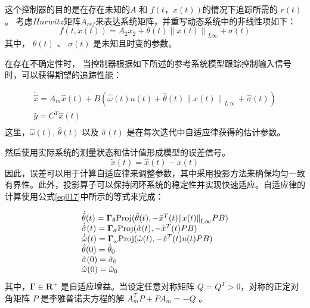这个控制器的目的是在存在未知的$A$ 和 $f(t，x(t))$的情况下追踪所需的 $r(t)$。 考虑$Hurwitz$矩阵$A_{ref}$来表达系统矩阵，并重写动态系统中的非线性项如下：
\begin{equation}
f(t,x(t)) = {A_2}{x_2} + \theta (t){\left\| {x(t)} \right\|_{L\infty }} + \sigma (t)
\end{equation}
其中， $\theta(t)$ 、 $\sigma(t)$ 是未知且时变的参数。

在存在不确定性时， 当控制器根据如下所述的参考系统模型跟踪控制输入信号时，可以获得期望的追踪性能：

\begin{equation}
\begin{array}{l}
 \dot{\hat{x}} = {A_m}\hat x(t) + {B}(\hat \omega (t)u(t) + \hat \theta (t){\left\| {x(t)} \right\|_{L \propto }} + \hat \sigma (t)) \\
 \hat y = {C^T}\hat x(t) \\
 \end{array}
 \end{equation}
这里，$\hat \omega (t)$, $\hat \theta (t)$ 以及 $\hat \sigma (t)$ 是在每次迭代中自适应律获得的估计参数。

然后使用实际系统的测量状态和估计值形成模型的误差信号。
\begin{equation}
\tilde x(t) = \hat x(t) - x(t)
\end{equation}
因此，误差可以用于计算自适应律来调整参数，其中采用投影方法来确保均匀一致有界性。此外，投影算子可以保持闭环系统的稳定性并实现快速适应。自适应律的计算使用公式\ref{eq017}中所示的等式来完成：

\begin{equation}
\begin{array}{l}
 \dot {\hat {\theta }}(t) = {{\boldsymbol{\Gamma }}_\theta } {\rm{Proj}}(\hat \theta (t), - {{\tilde x}^T}(t){\left\| {x(t)} \right\|_{{\rm{L}}\infty }}PB) \\
 \dot {\hat {\sigma }}(t) = {{\boldsymbol{\Gamma }}_\sigma } {\rm{Proj}}(\hat \sigma (t), - {{\tilde x}^T}(t)PB) \\
 \dot {\hat {\omega }}(t) = {{\boldsymbol{\Gamma }}_\omega } {\rm{Proj}}(\hat \omega (t), - {{\tilde x}^T}(t)u(t)PB) \\
 \hat {\theta } (0)= {{\hat \theta }_0} \\
 \hat {\sigma } (0)= {{\hat \sigma }_0} \\
 \hat {\omega } (0)= {{\hat \omega }_0} \\
 \end{array}
 \end{equation}
其中，$\boldsymbol{\Gamma} \in {\mathbf{R}}^{ + }$ 是自适应增益。当设定任意对称矩阵 $Q=Q^{T}>0$，对称的正定对角矩阵 $P$ 是李雅普诺夫方程的解 $A_m^TP + P{A_m} =  - Q$ 。

